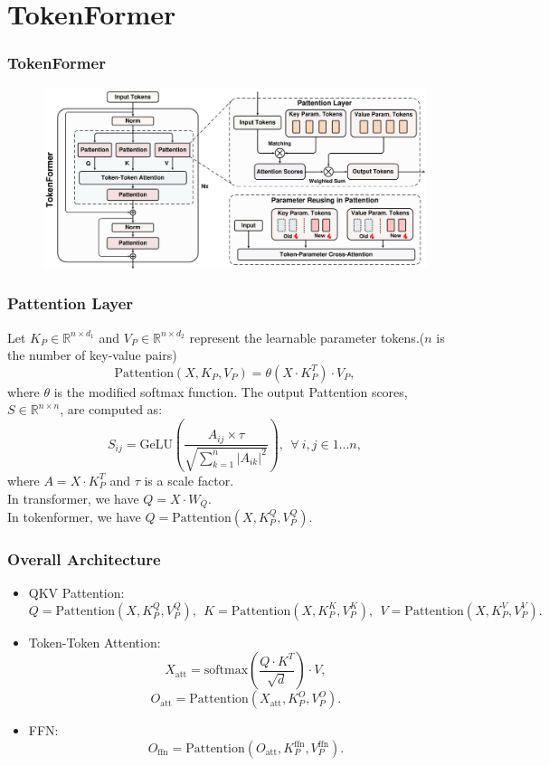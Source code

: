 \section{TokenFormer}
\label{sec:tokenformer}
\begin{frame}
\frametitle{TokenFormer}
\begin{figure}[h]
    \centering
    \includegraphics[width=0.99\linewidth]{./transformer-paper/arch2.pdf}
    \vspace{-0.1cm}
    \label{fig:tokenformer_figure}
    \vspace{-6pt}
\end{figure}
\end{frame}

\begin{frame}
\frametitle{Pattention Layer}
Let $K_P\in \mathbb{R}^{n\times d_1}$ and $V_P\in \mathbb{R}^{n\times d_2}$
represent the learnable parameter tokens.($n$ is the number of key-value pairs)
\begin{equation}
    \text{Pattention}(X,K_P,V_P)=\theta(X\cdot K_P^T)\cdot V_P,
\end{equation}
where $\theta$ is the modified softmax function. The output Pattention
scores, $S\in \mathbb{R}^{n\times n}$, are computed as:
\begin{equation}
    S_{ij} = \text{GeLU}\left(\frac{A_{ij} \times \tau}{\sqrt{\sum_{k=1}^n |A_{ik}|^2}}\right),
    ~~\forall~i,j \in 1...n,
\end{equation}
where $A=X\cdot K_P^T$ and $\tau$ is a scale factor.\\ \vspace{5pt}
In transformer, we have $Q=X\cdot W_Q$.\\
In tokenformer, we have $Q=\text{Pattention}(X,K_P^Q,V_P^Q)$.
\end{frame}

\begin{frame}
\frametitle{Overall Architecture}
\begin{itemize}
    \item QKV Pattention:$$Q=\text{Pattention}(X,K_P^Q,V_P^Q),~~
    K = \text{Pattention}(X,K_P^K,V_P^K),~~ V = \text{Pattention}(X,K_P^V,V_P^V).$$
    \item Token-Token Attention:
    $$X_{\text{att}}=\text{softmax}\left(\frac{Q\cdot K^T}{\sqrt{d}}\right)\cdot V,$$
    $$O_{\text{att}}=\text{Pattention}(X_{\text{att}},K_P^O,V_P^O).$$
    \item FFN:
    $$O_{\text{ffn}}=\text{Pattention}(O_{\text{att}},K_P^{\text{ffn}},V_P^{\text{ffn}}).$$
\end{itemize}
\end{frame}

